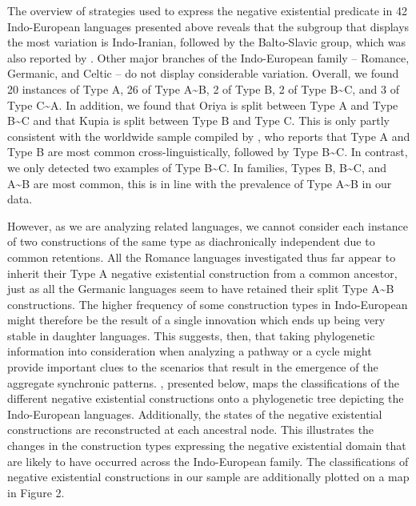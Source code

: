﻿\documentclass[output=paper]{langsci/langscibook}
\begin{document}
The overview of strategies used to express the negative existential
predicate in 42 Indo-European languages presented above reveals that the
subgroup that displays the most variation is Indo-Iranian, followed by the
Balto-Slavic group, which was also reported by \citet{Veselinova2014}.
Other major branches of the Indo-European family – Romance, Germanic, and
Celtic – do not display considerable variation. Overall, we found 20
instances of Type A, 26 of Type A{\textasciitilde}B, 2 of Type B, 2 of Type
B{\textasciitilde}C, and 3 of Type C{\textasciitilde}A. In addition, we
found that Oriya is split between Type A and Type B{\textasciitilde}C and
that Kupia is split between Type B and Type C. This is only partly
consistent with the worldwide sample compiled by
\citet[147]{Veselinova2016}, who reports that Type A and Type B are most
common cross-linguistically, followed by Type B{\textasciitilde}C. In
contrast, we only detected two examples of Type B{\textasciitilde}C. In
 families, Types B, B{\textasciitilde}C, and A{\textasciitilde}B are most common, this is in line with the prevalence of Type A{\textasciitilde}B in our data.

However, as we are analyzing related languages, we cannot consider each
instance of two constructions of the same type as diachronically
independent due to common retentions. All the Romance languages
investigated thus far appear to inherit their Type A negative existential
construction from a common ancestor, just as all the Germanic languages
seem to have retained their split Type A{\textasciitilde}B constructions.
The higher frequency of some construction types in Indo-European might
therefore be the result of a single innovation which ends up being very
stable in daughter languages. This suggests, then, that taking phylogenetic
information into consideration when analyzing a pathway or a cycle might
provide important clues to the scenarios that result in the emergence of
the aggregate synchronic patterns. , presented below,
maps the classifications of the different negative existential
constructions onto a phylogenetic tree depicting the Indo-European
languages. Additionally, the states of the negative existential
constructions are reconstructed at each ancestral node. This illustrates
the changes in the construction types expressing the negative existential
domain that are likely to have occurred across the Indo-European
family. The classifications of negative existential constructions in our sample are additionally plotted on a map in Figure 2.
\end{document}
